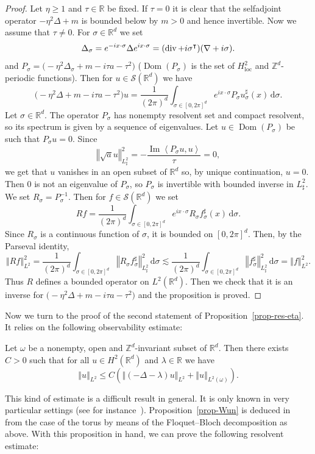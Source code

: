 \documentclass[10pt]{amsart}
\theoremstyle{definition}\newtheorem{defi}[theo]{Definition}\newtheorem{rema}[theo]{Remark}\newtheorem{exam}[theo]{Example}\newtheorem{exem}[theo]{Example}\newtheorem{nota}[theo]{Notation}
\newcommand{\nr}[1]{\left\Vert #1\right\Vert}
\newcommand{\innp}[2]{\left< #1, #2 \right>}
\renewcommand{\leq}{\leqslant}
\renewcommand{\geq}{\geqslant}
\newcommand{\inv}{^{-1}}
\newcommand{\1}{\mathds 1}
\newcommand{\trsp}{^{\intercal}}
\newcommand{\divg}{\mathop{\rm{div}}\nolimits}
\DeclareMathOperator{\Imop}{Im}
\DeclareMathOperator{\Dom}{Dom}
\renewcommand{\Im}{\Imop}
\newcommand{\loc}{{\mathrm{loc}}}
\newcommand{\R}{\mathbb{R}}
\newcommand{\D}{\Delta}
\renewcommand{\l}{\lambda}
\newcommand{\s}{\sigma}
\renewcommand{\t}{\tau}
\renewcommand{\o}{\omega}
\newcommand{\Sc}{{\mathcal S}}
\newcommand{\dd}{\mathrm{d}}
\newcommand{\dsigma}{\dd \sigma}
\begin{document}
\begin{proof}
Let $\eta \geq 1$ and $\t \in \R$ be fixed. If $\t = 0$ it is clear that the selfadjoint operator $-\eta^2 \D + m$ is bounded below by $m > 0$ and hence invertible. Now we assume that $\t \neq 0$. For $\s \in \R^d$ we set
\[
\D_\s = e^{-ix\cdot \s} \D e^{ix\cdot \s} = (\divg + i \s\trsp) (\nabla + i\s).
\]
and $P_\s = \big(-\eta^2 \D_\s + m - i\t a - \t^2 \big)$ ($\Dom(P_\s)$ is the set of $H^2_\loc$ and $\mathbb Z^d$-periodic functions). Then for $u \in \Sc(\R^d)$ we have
\[
\big(-\eta^2 \D + m - i\t a - \t^2 \big) u = \frac 1 {(2\pi)^d} \int_{\s \in [0,2\pi]^d} e^{ix\cdot \s} P_\s u^\sharp_\s(x) \, \dsigma.
\]
Let $\s \in \R^d$. The operator $P_\s$ has nonempty resolvent set and compact resolvent, so its spectrum is given by a sequence of eigenvalues. Let $u \in \Dom(P_\s)$ be such that $P_\s u = 0$. Since
\[
\nr{\sqrt a u}_{L^2_\sharp}^2 = - \frac {\Im \innp{P_\s u}{u}} \t = 0,
\]
we get that $u$ vanishes in an open subset of $\R^d$ so, by unique continuation, $u = 0$. Then 0 is not an eigenvalue of $P_\s$, so $P_\s$ is invertible with bounded inverse in $L^2_\sharp$. We set $R_\s = P_\s\inv$. Then for $f \in \Sc(\R^d)$ we set
\[
R f = \frac 1 {(2\pi)^d} \int_{\s \in [0,2\pi]^d} e^{ix\cdot \s} R_\s f^\sharp_\s(x) \, \dsigma.
\]
Since $R_\s$ is a continuous function of $\s$, it is bounded on $[0,2\pi]^d$. Then, by the Parseval identity,
\[
\nr{Rf}_{L^2}^2 = \frac 1 {(2\pi)^d} \int_{\s \in [0,2\pi]^d} \nr{R_\s f_\s^\sharp}_{L^2_\sharp}^2 \, \dsigma \lesssim \frac 1 {(2\pi)^d} \int_{\s \in [0,2\pi]^d} \nr{ f_\s^\sharp}_{L^2_\sharp}^2 \, \dsigma = \nr{f}_{L^2}^2.
\]
Thus $R$ defines a bounded operator on $L^2(\R^d)$. Then we check that it is an inverse for $\big(-\eta^2 \D + m - i\t a - \t^2 \big)$ and the proposition is proved.
\end{proof}

Now we turn to the proof of the second statement of Proposition~\ref{prop-res-eta}. It relies on the following observability estimate:

\begin{prop}\label{prop-Wun}
Let $\o$ be a nonempty, open and $\mathbb Z^d$-invariant subset of $\R^d$. Then there exists $C > 0$ such that for all $u \in H^2(\R^d)$ and $\l \in \R$ we have
\[
\nr{u}_{L^2} \leq C \left(\nr{(-\D - \l)u}_{L^2} + \nr{u}_{L^2(\o)} \right).
\]
\end{prop}

This kind of estimate is a difficult result in general. It is only known in very particular settings (see for instance~\cite{Jaffard90,BurqZwo12,AnantharamanLeMa16}). Proposition~\ref{prop-Wun} is deduced in~\cite{Wunsch} from the case of the torus by means of the Floquet--Bloch decomposition as above. With this proposition in hand, we can prove the following resolvent estimate:
\end{document}

